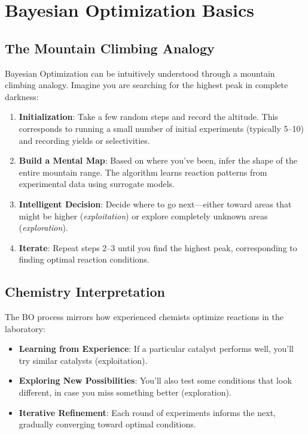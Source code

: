 \documentclass[12pt,a4paper]{article}
\begin{document}
\section{Bayesian Optimization Basics}
\label{sec:bo_basics}

\subsection{The Mountain Climbing Analogy}

Bayesian Optimization can be intuitively understood through a mountain climbing analogy. Imagine you are searching for the highest peak in complete darkness:

\begin{enumerate}
    \item \textbf{Initialization}: Take a few random steps and record the altitude. This corresponds to running a small number of initial experiments (typically 5--10) and recording yields or selectivities.
    
    \item \textbf{Build a Mental Map}: Based on where you've been, infer the shape of the entire mountain range. The algorithm learns reaction patterns from experimental data using surrogate models.
    
    \item \textbf{Intelligent Decision}: Decide where to go next---either toward areas that might be higher (\textit{exploitation}) or explore completely unknown areas (\textit{exploration}).
    
    \item \textbf{Iterate}: Repeat steps 2--3 until you find the highest peak, corresponding to finding optimal reaction conditions.
\end{enumerate}

\subsection{Chemistry Interpretation}

The BO process mirrors how experienced chemists optimize reactions in the laboratory:

\begin{itemize}
    \item \textbf{Learning from Experience}: If a particular catalyst performs well, you'll try similar catalysts (exploitation).
    \item \textbf{Exploring New Possibilities}: You'll also test some conditions that look different, in case you miss something better (exploration).
    \item \textbf{Iterative Refinement}: Each round of experiments informs the next, gradually converging toward optimal conditions.
\end{itemize}
\end{document}

